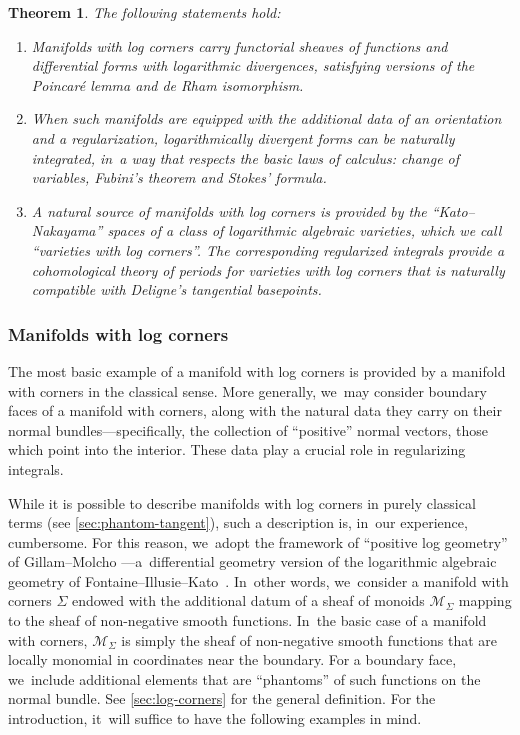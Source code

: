 \documentclass[JEP,XML,SOM,Unicode,NoFloatCountersInSection,published]{cedram}
\newtheorem{theorem}{Theorem}[section]
\theoremstyle{definition}
\theoremstyle{remark}
\newcommand{\cM}{\mathscr{M}}
\newcommand{\Sig}{\Sigma}
\begin{document}
\begin{theorem}The following statements hold:
\begin{enumerate}
\item Manifolds with log corners carry functorial sheaves of functions and differential forms with logarithmic divergences, satisfying versions of the Poincaré lemma and de Rham isomorphism.
\item When such manifolds are equipped with the additional data of an orientation and a regularization, logarithmically divergent forms can be naturally integrated, in~a way that respects the basic laws of calculus: change of variables, Fubini's theorem and Stokes' formula.
\item A natural source of manifolds with log corners is provided by the ``Kato--Nakayama'' spaces of a class of logarithmic algebraic varieties, which we call ``varieties with log corners''. The corresponding regularized integrals provide a cohomological theory of periods for varieties with log corners that is naturally compatible with Deligne's tangential basepoints.
\end{enumerate}
\end{theorem}

\subsubsection{Manifolds with log corners}
The most basic example of a manifold with log corners is provided by a manifold with corners in the classical sense. More generally, we~may consider boundary faces of a manifold with corners, along with the natural data they carry on their normal bundles---specifically, the collection of ``positive'' normal vectors, \ie those which point into the interior. These data play a crucial role in regularizing integrals.

While it is possible to describe manifolds with log corners in purely classical terms (see \autoref{sec:phantom-tangent}), such a description is, in~our experience, cumbersome. For this reason, we~adopt the framework of ``positive log geometry'' of Gillam--Molcho \cite{GillamMolcho}---a~differential geometry version of the logarithmic algebraic geometry of Fontaine--Illusie--Kato~\cite{Kato1989a, IllusieLogSpaces, Ogus}. In~other words, we~consider a manifold with corners $\Sig$ endowed with the additional datum of a sheaf of monoids $\cM_\Sig$ mapping to the sheaf of non-negative smooth functions. In~the basic case of a manifold with corners, $\cM_\Sig$ is simply the sheaf of non-negative smooth functions that are locally monomial in coordinates near the boundary. For a boundary face, we~include additional elements that are ``phantoms'' of such functions on the normal bundle. See \autoref{sec:log-corners} for the general definition. For the introduction, it~will suffice to have the following examples in mind.
\end{document}
